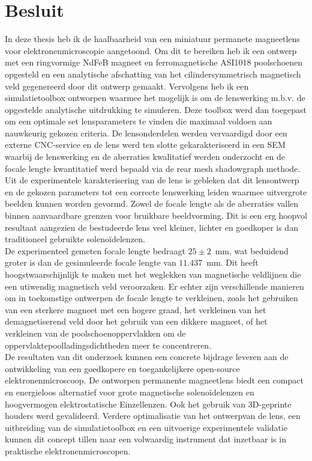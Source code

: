 \documentclass[we,twoside,openright,a4paper,11pt]{uantwerpenbamathesis}
\begin{document}
\chapter{Besluit}\label{ch:besluit}
In deze thesis heb ik de haalbaarheid van een miniatuur permanete magneetlens voor elektronenmicroscopie aangetoond. Om dit te bereiken heb ik een ontwerp met een ringvormige NdFeB magneet en ferromagnetische ASI1018 poolschoenen opgesteld en een analytische afschatting van het cilindersymmetrisch magnetisch veld gegenereerd door dit ontwerp gemaakt. Vervolgens heb ik een simulatietoolbox ontworpen waarmee het mogelijk is om de lenswerking m.b.v. de opgestelde analytische uitdrukking te simuleren. Deze toolbox werd dan toegepast om een optimale set lensparameters te vinden die maximaal voldoen aan nauwkeurig gekozen criteria. De lensonderdelen werden vervaardigd door een externe CNC-service en de lens werd ten slotte gekarakteriseerd in een SEM waarbij de lenswerking en de aberraties kwalitatief werden onderzocht en de focale lengte kwantitatief werd bepaald via de rear mesh shadowgraph methode.\\

Uit de experimentele karakterisering van de lens is gebleken dat dit lensontwerp en de gekozen parameters tot een correcte lenswerking leiden waarmee uitvergrote beelden kunnen worden gevormd. Zowel de focale lengte als de aberraties vallen binnen aanvaardbare grenzen voor bruikbare beeldvorming. Dit is een erg hoopvol resultaat aangezien de bestudeerde lens veel kleiner, lichter en goedkoper is dan traditioneel gebruikte solenoïdelenzen.\\

De experimenteel gemeten focale lengte bedraagt $25 \pm 2$~mm, wat beduidend groter is dan de gesimuleerde focale lengte van $11.437$~mm. Dit heeft hoogstwaarschijnlijk te maken met het weglekken van magnetische veldlijnen die een utiwendig magnetisch veld veroorzaken. Er echter zijn verschillende manieren om in toekomstige ontwerpen de focale lengte te verkleinen, zoals het gebruiken van een sterkere magneet met een hogere graad, het verkleinen van het demagnetiserend veld door het gebruik van een dikkere magneet, of het verkleinen van de poolschoenoppervlakken om de oppervlaktepoolladingsdichtheden meer te concentreren.\\

De resultaten van dit onderzoek kunnen een concrete bijdrage leveren aan de ontwikkeling van een goedkopere en toegankelijkere open-source elektronenmicroscoop. De ontworpen permanente magneetlens biedt een compact en energieloos alternatief voor grote magnetische solenoïdelenzen en hoogvermogen elektrostatische Einzellenzen. Ook het gebruik van 3D-geprinte houders werd gevalideerd. Verdere optimalisatie van het ontwerpvan de lens, een uitbreiding van de simulatietoolbox en een uitvoerige experimentele validatie kunnen dit concept tillen naar een volwaardig instrument dat inzetbaar is in praktische elektronenmicroscopen.
\end{document}
